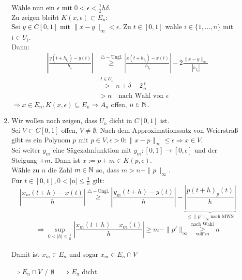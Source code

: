 \begin{beweis}
\begin{enumerate}[label=\roman*\upshape)]
			Wähle nun ein $\epsilon$ mit $0 < \epsilon < \frac{1}{2} h \delta$. \\
			Zu zeigen bleibt $K(x, \epsilon) \subset E_{n}$: \\
			Sei $y \in C[0, 1]$ mit $\| x - y \|_{\infty} < \epsilon$. Zu $t \in [0, 1]$ wähle $i \in \{ 1, \dotsc, n \}$ mit $t \in U_{i}$. \\
			Dann:
			\begin{align*}
				\left| \frac{y(t + h_{t_{i}}) - y(t)}{h_{t_{i}}} \right| & \overset{\triangle-\text{Ungl.}}{\geq} \left| \frac{x(t + h_{t_{i}}) - x(t)}{h_{t_{i}}} \right| - 2 \frac{\| x - y \|_{\infty}}{|h_{t_{i}}|} \\
				& \overset{t \in U_{t_{i}}}{>} n + \delta - 2 \frac{\epsilon}{n} \\
				& > n \quad \text{nach Wahl von } \epsilon
			\end{align*}
			$\Rightarrow x \in E_{n}, K(x, \epsilon) \subseteq E_{n} \Rightarrow A_{n}$ offen, $n \in \mathbb{N}$.
		\item Wir wollen noch zeigen, dass $U_{n}$ dicht in $C[0, 1]$ ist. \\
			Sei $V \subset C[0, 1]$ offen, $V \neq \emptyset$. Nach dem Approximationssatz von Weierstra{\ss} gibt es ein Polynom $p$ mit $p \in V, \epsilon > 0: \| x - p \|_{\infty} \leq \epsilon \Rightarrow x \in V$. \\
			Sei weiter $y_{m}$ eine Sägezahnfunktion mit $y_{m}: [0, 1] \rightarrow [0, \epsilon]$ und der Steigung $\pm m$.
			Dann ist $x := p + {m} \in K(p, \epsilon)$. \\
			Wähle zu $n$ die Zahl $m \in \mathbb{N}$ so, dass $m > n + \| p \|_{\infty}$. \\
			Für $t \in [0, 1], 0 < | n | \leq \frac{1}{n}$ gilt:
			\[ \left| \frac{x_{m}(t + h) - x(t)}{h} \right| \overset{\triangle-\text{Ungl.}}{\geq} \left| \frac{y_{m}(t + h) - y(t)}{h} \right| - \underbrace{\left| \frac{p(t + h) _ p(t)}{h} \right|}_{\leq{\| p' \|_{\infty}} \text{nach MWS}}  \]
			\[ \Rightarrow \sup_{0 < |h| \leq \frac{1}{n}} \left| \frac{x_{m}(t + h) - x_{m}(t)}{h} \right| \geq m - \| p' \|_{\infty} \overset{\text{nach Wahl}}{\underset{\text{von }m}{\geq}} n \] \\
			Damit ist $x_{m} \in E_{n}$ und sogar $x_{m} \in E_{n} \cap V$ \\ \\
			$\Rightarrow E_{n} \cap V \neq \emptyset \quad \Rightarrow E_{n} \text{ dicht.}$
	\end{enumerate}	
\end{beweis}


